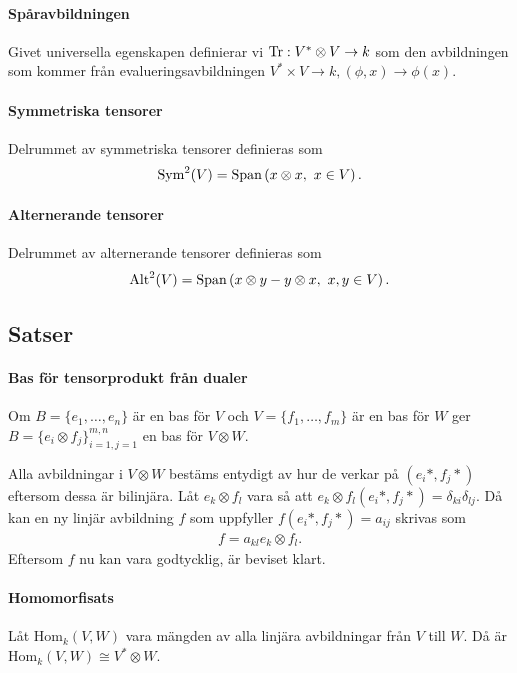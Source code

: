 \paragraph{Spåravbildningen}
Givet universella egenskapen definierar vi $\Tr: V^{*}\otimes V\to k$ som den avbildningen som kommer från evalueringsavbildningen $V^{*}\times V\to k, (\phi, x)\to \phi(x)$.

\paragraph{Symmetriska tensorer}
Delrummet av symmetriska tensorer definieras som
\begin{align*}
	\Sym[2]{V} = \Span{x\otimes x,\ x\in V}.
\end{align*}

\paragraph{Alternerande tensorer}
Delrummet av alternerande tensorer definieras som
\begin{align*}
	\Alt[2]{V} = \Span{x\otimes y - y\otimes x,\ x, y\in V}.
\end{align*}

\subsection{Satser}

\paragraph{Bas för tensorprodukt från dualer}
Om $B = \{e_{1}, \dots, e_{n}\}$ är en bas för $V$ och $V = \{f_{1}, \dots, f_{m}\}$ är en bas för $W$ ger $B = \{e_{i}\otimes f_{j}\}_{i = 1, j = 1}^{m, n}$ en bas för $V\otimes W$.

\proof
Alla avbildningar i $V\otimes W$ bestäms entydigt av hur de verkar på $(e_{i}*, f_{j}*)$ eftersom dessa är bilinjära. Låt $e_{k}\otimes f_{l}$ vara så att $e_{k}\otimes f_{l}(e_{i}*, f_{j}*) = \delta_{ki}\delta_{lj}$. Då kan en ny linjär avbildning $f$ som uppfyller $f(e_{i}*, f_{j}*) = a_{ij}$ skrivas som
\begin{align*}
	f = a_{kl}e_{k}\otimes f_{l}.
\end{align*}
Eftersom $f$ nu kan vara godtycklig, är beviset klart.

\paragraph{Homomorfisats}
Låt $\text{Hom}_{k}(V, W)$ vara mängden av alla linjära avbildningar från $V$ till $W$. Då är $\text{Hom}_{k}(V, W)\cong V^{*}\otimes W$.

